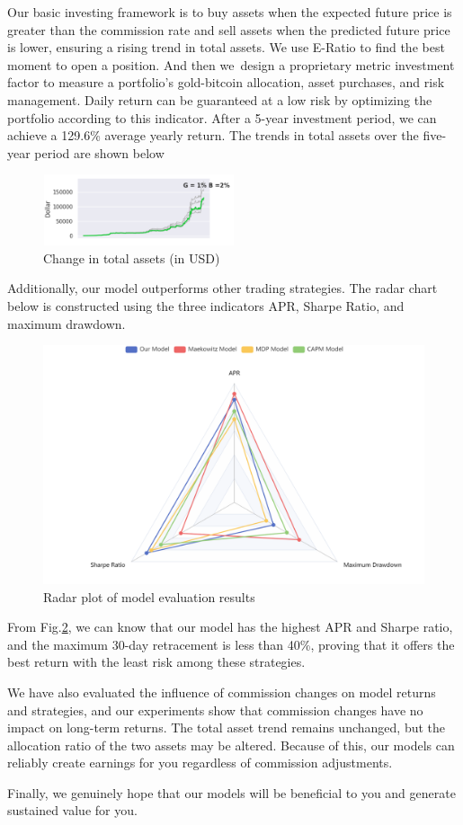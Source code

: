 \documentclass{mcmthesis}
\begin{document}
\begin{memo}
Our basic investing framework is to buy assets when the expected future price is greater than the commission rate and sell assets when the predicted future price is lower, ensuring a rising trend in total assets. We use E-Ratio to find the best moment to open a position. And then we design a proprietary metric investment factor to measure a portfolio's gold-bitcoin allocation, asset purchases, and risk management. Daily return can be guaranteed at a low risk by optimizing the portfolio according to this indicator.
After a 5-year investment period, we can achieve a 129.6\% average yearly return. The trends in total assets over the five-year period are shown below
\begin{figure}[H]	%
	\centering
	\includegraphics[width=0.5\textwidth]{nice}	%
	\caption{Change in total assets (in USD)} 
	\label{fig:USD}		%
\end{figure}
Additionally, our model outperforms other trading strategies. The radar chart below is constructed using the three indicators APR, Sharpe Ratio, and maximum drawdown.
\begin{figure}[H]	%
	\centering
	\includegraphics[height=0.4\textwidth]{radar}	%
	\caption{Radar plot of model evaluation results} 
	\label{fig:radarnew}		%
\end{figure}
From Fig.\ref{fig:radarnew}, we can know that our model has the highest APR and Sharpe ratio, and the maximum 30-day retracement is less than 40\%, proving that it offers the best return with the least risk among these strategies.

We have also evaluated the influence of commission changes on model returns and strategies, and our experiments show that commission changes have no impact on long-term returns. The total asset trend remains unchanged, but the allocation ratio of the two assets may be altered. Because of this, our models can reliably create earnings for you regardless of commission adjustments.

Finally, we genuinely hope that our models will be beneficial to you and generate sustained value for you.
	
	
\end{memo}
\end{document}
